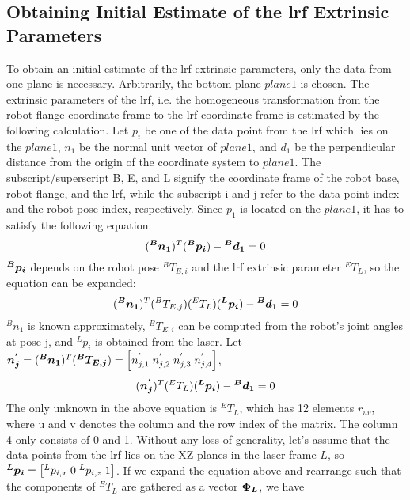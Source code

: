 \subsection{Obtaining Initial Estimate of the \ac{lrf} Extrinsic Parameters}
\label{sec:first_step}
To obtain an initial estimate of the \ac{lrf} extrinsic parameters, only the data from one plane is necessary. Arbitrarily, the bottom plane $plane 1$ is chosen. The extrinsic parameters of the \ac{lrf}, i.e. the homogeneous transformation from the robot flange coordinate frame to the \ac{lrf} coordinate frame is estimated by the following calculation. 
Let $p_i$ be one of the data point from the \ac{lrf} which lies on the $plane 1$, $n_1$ be the normal unit vector of $plane 1$, and $d_1$ be the perpendicular distance from the origin of the coordinate system to $plane 1$. The subscript/superscript B, E, and L signify the coordinate frame of the robot base, robot flange, and the \ac{lrf}, while the subscript i and j refer to the data point index and the robot pose index, respectively. 
Since $p_1$ is located on the $plane 1$, it has to satisfy the following equation:
  \begin{equation}
  (\vb*{{^B}n_1}) ^T (\vb*{{^B}p_i}) - \vb*{{^B}d_1} = 0
   \end{equation}
$\vb*{{^B}p_i}$ depends on the robot pose ${^B}T_{E,i}$ and the \ac{lrf} extrinsic parameter ${^E}T_L$, so the equation can be expanded:
  \begin{equation}
  (\vb*{{^B}n_1}) ^T ({^B}T_{E,j}) ({^E}T_L) (\vb*{{^L}p_i}) - \vb*{{^B}d_1} = 0
  \end{equation}
${^B}n_1$ is known approximately, ${^B}T_{E,i}$ can be computed from the robot's joint angles at pose j, and ${^L}p_i$ is obtained from the laser. Let $\vb*{n^{'}_j} = (\vb*{{^B}n_1}) ^T (\vb*{{^B}T_{E,j}}) = 
\left[n^{'}_{j,1} \; n^{'}_{j,2} \; n^{'}_{j,3}  \; n^{'}_{j,4} \right]$,  
  \begin{equation}
  (\vb*{n^{'}_j}) ^T ({^E}T_L) (\vb*{{^L}p_i}) - \vb*{{^B}d_1} = 0
  \end{equation}
The only unknown in the above equation is ${^E}T_L$, which has 12 elements $r_{uv}$, where u and v denotes the column and the row index of the matrix. The column 4 only consists of 0 and 1. Without any loss of generality, let's assume that the data points from the \ac{lrf} lies on the XZ planes in the laser frame $L$, so $\vb*{{^L}p_i} = \left[{^L}p_{i,x} \; 0 \; {^L}p_{i,z}\; 1\right]$. If we expand the equation above and rearrange such that the components of ${^E}T_L$ are gathered as a vector $\vb*{\Phi_L}$, we have
